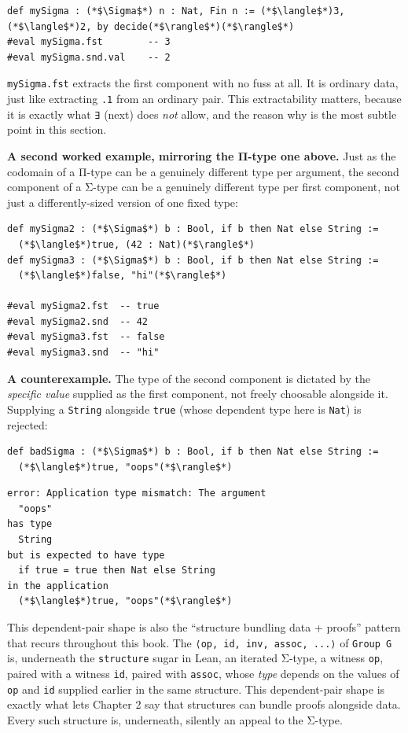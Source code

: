 \begin{lstlisting}
def mySigma : (*$\Sigma$*) n : Nat, Fin n := (*$\langle$*)3, (*$\langle$*)2, by decide(*$\rangle$*)(*$\rangle$*)
#eval mySigma.fst        -- 3
#eval mySigma.snd.val    -- 2
\end{lstlisting}

\texttt{mySigma.fst} extracts the first component with no fuss at all. It is ordinary data, just like extracting \texttt{.1} from an ordinary pair. This extractability matters, because it is exactly what \texttt{∃} (next) does \emph{not} allow, and the reason why is the most subtle point in this section.

\textbf{A second worked example, mirroring the Π-type one above.} Just as the codomain of a Π-type can be a genuinely different type per argument, the second component of a Σ-type can be a genuinely different type per first component, not just a differently-sized version of one fixed type:

\begin{lstlisting}
def mySigma2 : (*$\Sigma$*) b : Bool, if b then Nat else String :=
  (*$\langle$*)true, (42 : Nat)(*$\rangle$*)
def mySigma3 : (*$\Sigma$*) b : Bool, if b then Nat else String :=
  (*$\langle$*)false, "hi"(*$\rangle$*)

#eval mySigma2.fst  -- true
#eval mySigma2.snd  -- 42
#eval mySigma3.fst  -- false
#eval mySigma3.snd  -- "hi"
\end{lstlisting}

\textbf{A counterexample.} The type of the second component is dictated by the \emph{specific value} supplied as the first component, not freely choosable alongside it. Supplying a \texttt{String} alongside \texttt{true} (whose dependent type here is \texttt{Nat}) is rejected:

\begin{lstlisting}
def badSigma : (*$\Sigma$*) b : Bool, if b then Nat else String :=
  (*$\langle$*)true, "oops"(*$\rangle$*)
\end{lstlisting}

\begin{lstlisting}
error: Application type mismatch: The argument
  "oops"
has type
  String
but is expected to have type
  if true = true then Nat else String
in the application
  (*$\langle$*)true, "oops"(*$\rangle$*)
\end{lstlisting}

This dependent-pair shape is also the ``structure bundling data + proofs'' pattern that recurs throughout this book. The \texttt{⟨op, id, inv, assoc, ...⟩} of \texttt{Group G} is, underneath the \texttt{structure} sugar in Lean, an iterated Σ-type, a witness \texttt{op}, paired with a witness \texttt{id}, paired with \texttt{assoc}, whose \emph{type} depends on the values of \texttt{op} and \texttt{id} supplied earlier in the same structure. This dependent-pair shape is exactly what lets Chapter 2 say that structures can bundle proofs alongside data. Every such structure is, underneath, silently an appeal to the Σ-type.

